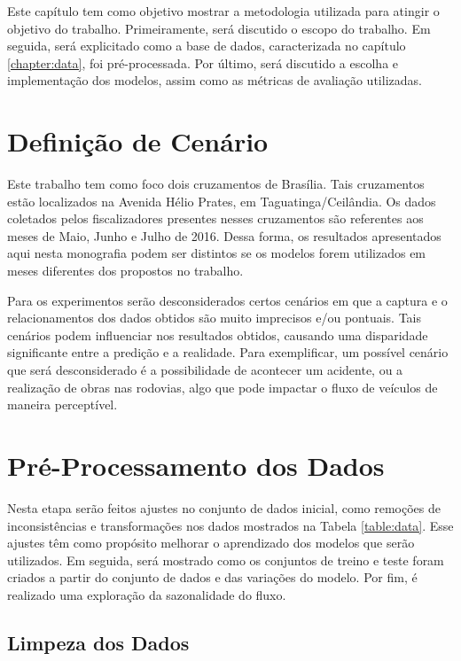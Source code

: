 \label{chapter:methodology}
Este capítulo tem como objetivo mostrar a metodologia utilizada para atingir o objetivo do trabalho. Primeiramente, será discutido o escopo do trabalho. Em seguida, será explicitado como a base de dados, caracterizada no capítulo \ref{chapter:data}, foi pré-processada. Por último, será discutido a escolha e implementação dos modelos, assim como as métricas de avaliação utilizadas.

\section{Definição de Cenário}

Este trabalho tem como foco dois cruzamentos de Brasília. Tais cruzamentos estão localizados na Avenida Hélio Prates, em Taguatinga/Ceilândia. Os dados coletados pelos fiscalizadores presentes nesses cruzamentos são referentes aos meses de Maio, Junho e Julho de 2016. Dessa forma, os resultados apresentados aqui nesta monografia podem ser distintos se os modelos forem utilizados em meses diferentes dos propostos no trabalho.

Para os experimentos serão desconsiderados certos cenários em que a captura e o relacionamentos dos dados obtidos são muito imprecisos e/ou pontuais. Tais cenários podem influenciar nos resultados obtidos, causando uma disparidade significante entre a predição e a realidade. Para exemplificar, um possível cenário que será desconsiderado é a possibilidade de acontecer um acidente, ou a realização de obras nas rodovias, algo que pode impactar o fluxo de veículos de maneira perceptível.

\section{Pré-Processamento dos Dados}

Nesta etapa serão feitos ajustes no conjunto de dados inicial, como remoções de inconsistências e transformações nos dados mostrados na Tabela \ref{table:data}. Esse ajustes têm como propósito melhorar o aprendizado dos modelos que serão utilizados. Em seguida, será mostrado como os conjuntos de treino e teste foram criados a partir do conjunto de dados e das variações do modelo. Por fim, é realizado uma exploração da sazonalidade do fluxo.

\subsection{Limpeza dos Dados}

